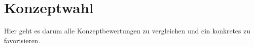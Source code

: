 \section{Konzeptwahl}
Hier geht es darum alle Konzeptbewertungen zu vergleichen und ein konkretes zu favorisieren.